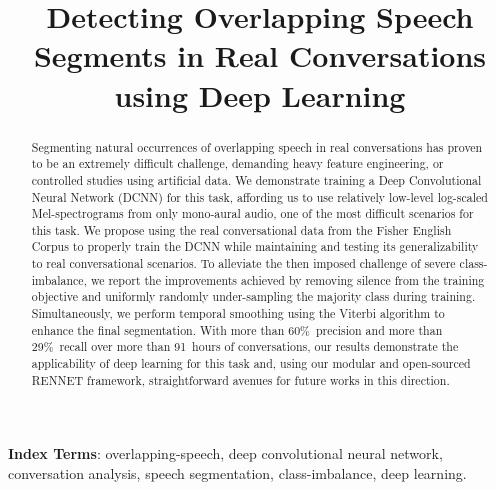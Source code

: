 \documentclass[a4paper]{article}
\title{
       Detecting Overlapping Speech Segments in Real Conversations\\
       using Deep Learning
}
\begin{document}
\maketitle

\newcommand{\outline}[1]{}  %
\newcommand{\widom}[1]{}  %

\begin{abstract}
\widom{
       - the problem,
       - the approach and solutions
       - the main contributions of the paper.
       - little if any background and motivation. address the experts.
       - factual but comprehensive.
}
Segmenting natural occurrences of overlapping speech in real conversations has proven to be an extremely difficult challenge, demanding heavy feature engineering, or controlled studies using artificial data.
We demonstrate training a Deep Convolutional Neural Network (DCNN) for this task, affording us to use relatively low-level log-scaled Mel-spectrograms from only mono-aural audio, one of the most difficult scenarios for this task.
We propose using the real conversational data from the Fisher English Corpus to properly train the DCNN while maintaining and testing its generalizability to real conversational scenarios.
To alleviate the then imposed challenge of severe class-imbalance, we report the improvements achieved by removing silence from the training objective and uniformly randomly under-sampling the majority class during training.
Simultaneously, we perform temporal smoothing using the Viterbi algorithm to enhance the final segmentation.
With more than 60\%~precision and more than 29\%~recall over more than 91~hours of conversations, our results demonstrate the applicability of deep learning for this task and, using our modular and open-sourced RENNET framework,
straightforward avenues for future works in this direction.

\end{abstract}

\noindent\textbf{Index Terms}:
overlapping-speech,
deep convolutional neural network,
conversation analysis,
speech segmentation,
class-imbalance,
deep learning.

\end{document}

